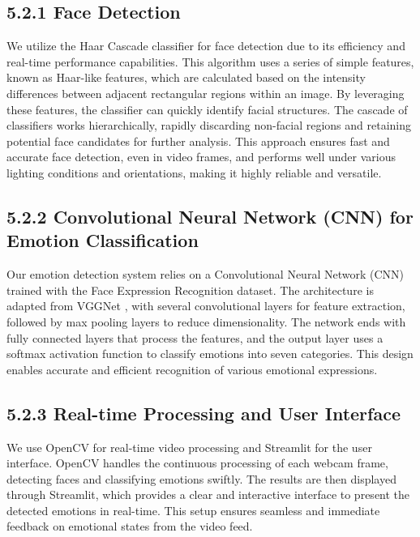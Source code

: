 \documentclass[12pt]{report}
\begin{document}
\subsection*{5.2.1 Face Detection}
\begin{center}
    \justify
We utilize the Haar Cascade classifier for face detection due to its efficiency and real-time performance capabilities. This algorithm uses a series of simple features, known as Haar-like features, which are calculated based on the intensity differences between adjacent rectangular regions within an image. By leveraging these features, the classifier can quickly identify facial structures. The cascade of classifiers works hierarchically, rapidly discarding non-facial regions and retaining potential face candidates for further analysis. This approach ensures fast and accurate face detection, even in video frames, and performs well under various lighting conditions and orientations, making it highly reliable and versatile.
\end{center}
\vspace{0.5em}
\subsection*{5.2.2 Convolutional Neural Network (CNN) for Emotion Classification}
\begin{center}
    \justify
Our emotion detection system relies on a Convolutional Neural Network (CNN) trained with the Face Expression Recognition dataset. The architecture is adapted from VGGNet , with several convolutional layers for feature extraction, followed by max pooling layers to reduce dimensionality. The network ends with fully connected layers that process the features, and the output layer uses a softmax activation function to classify emotions into seven categories. This design enables accurate and efficient recognition of various emotional expressions.
\end{center}
\vspace{0.5em}
\subsection*{5.2.3 Real-time Processing and User Interface}
\begin{center}
    \justify
We use OpenCV for real-time video processing and Streamlit for the user interface. OpenCV handles the continuous processing of each webcam frame, detecting faces and classifying emotions swiftly. The results are then displayed through Streamlit, which provides a clear and interactive interface to present the detected emotions in real-time. This setup ensures seamless and immediate feedback on emotional states from the video feed.
\end{center}
\end{document}
